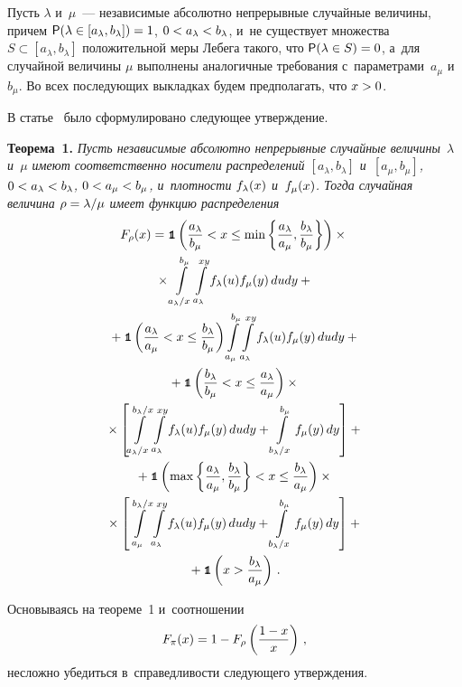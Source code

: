\begin{multicols}{2}
Пусть $\lambda$ и~$\mu$~--- независимые абсолютно непрерывные случайные 
величины, причем ${\sf P}(\lambda\hm\in[a_\lambda,b_\lambda])\hm=1$, $0\hm<a_\lambda\hm<b_\lambda$, 
и~не существует мно\-же\-ст\-ва $S\subset[a_\lambda,b_\lambda]$ положительной меры Лебега такого, что 
${\sf P}(\lambda\in S)\hm=0$, а~для случайной величины $\mu$ выполнены 
аналогичные требования с~параметрами~$a_\mu$ и~$b_\mu$. Во всех последующих выкладках 
будем предполагать, что $x\hm>0$.

В статье~\cite{K2016} было сформулировано следующее утверждение.

\smallskip

\noindent
\textbf{Теорема~1.} 
\textit{Пусть независимые абсолютно непрерывные случайные величины~$\lambda$ и~$\mu$ 
имеют соответственно носители распределений $[a_\lambda,b_\lambda]$ и~$[a_\mu,b_\mu]$, 
$0\hm<a_\lambda\hm<b_\lambda$, $0\hm<a_\mu\hm<b_\mu$, и~плотности $f_\lambda(x)$ и~$f_\mu(x)$. Тогда 
случайная величина $\rho\hm=\lambda/\mu$ имеет функцию распределения}
\begin{multline}
F_\rho(x)=
\Ik\left(\fr{a_\lambda}{b_\mu}<x\le 
\min\left\{\fr{a_\lambda}{a_\mu},\fr{b_\lambda}{b_\mu}\right\}\right)
\times{}\\
{}\times\il{a_\lambda/x}{b_\mu}
\il{a_\lambda}{xy}\fl(u)\fm(y)\, dudy+{}\\
{}+\Ik\left(\frac{a_\lambda}{a_\mu}<x\le \fr{b_\lambda}{b_\mu}\right)\il{a_\mu}{b_\mu}\il{a_\lambda}
{xy}\fl(u)\fm(y)\, dudy+{}\\
{}+\Ik\left(\fr{b_\lambda}{b_\mu}<x\le \fr{a_\lambda}{a_\mu}\right)\times{}\\
{}\times\left[
 \il{a_\lambda/x}{b_\lambda/x}\il{a_\lambda}{xy}\fl(u)\fm(y)\, dudy +
 \il{b_\lambda/x}{b_\mu}\fm(y)\, dy\right]+{}\\
{}+\Ik\left(\max\left\{\fr{a_\lambda}{a_\mu},\fr{b_\lambda}{b_\mu}\right\}<x\le
\fr{b_\lambda}{a_\mu}\right)\times{}\\
{}\times
\left[ \il{a_\mu}{b_\lambda/x}\il{a_\lambda}{xy}\fl(u)\fm(y)\, dudy+
\il{b_\lambda/x}{b_\mu}\fm(y)\, dy\right]+{}\\
{}+\Ik\left(x>\fr{b_\lambda}{a_\mu}\right)\,.
\label{F_rho}
\end{multline}


Основываясь на теореме~1 и~соотношении
$$
F_\pi(x)=1-F_\rho\left(\displaystyle\frac{\displaystyle 1-x\mathstrut}{\displaystyle x\mathstrut}\right)\,,
$$
несложно убедиться в~справедливости следующего утверждения.

\smallskip


\end{multicols}
